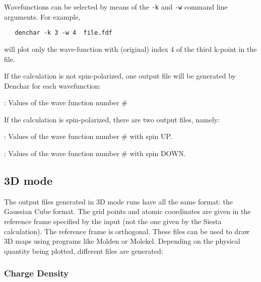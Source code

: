 Wavefunctions can be selected by means of the \texttt{-k} and
\texttt{-w} command line arguments. For example,
\begin{verbatim}
   denchar -k 3 -w 4  file.fdf
\end{verbatim}

will plot only the wave-function with (original) index 4 of the third
k-point in the file.

If the calculation is not spin-polarized,
one output file will be generated by {\sc Denchar}
for each wavefunction:

\begin{description}
\itemsep 10pt
\parsep 0pt

\item[{\bf {\it SystemLabel}.CON.WF\#}]: 
Values of the wave function number \#

\end{description}

If the calculation is spin-polarized, there are 
 two output files, namely:


\begin{description}
\itemsep 10pt
\parsep 0pt

\item[{\bf {\it SystemLabel}.CON.WF\#.UP}]: 
Values of the wave function number \# with spin UP.

\item[{\bf {\it SystemLabel}.CON.WF\#.DOWN}]: 
Values of the wave function number \# with spin DOWN.

\end{description}

\subsection{3D mode}
\label{cap:output3D}

The output files generated in 3D mode runs have all the
same format: the Gaussian Cube format. The grid points and
atomic coordinates are given in the reference frame specified
by the input (not the one given by the  {\sc Siesta}
calculation). The reference frame is orthogonal.
These files can be used to draw 3D maps using programs
like  {\sc Molden} or {\sc Molekel}.
Depending on the physical quantity being plotted, 
different files are generated:

\subsubsection{Charge Density}

